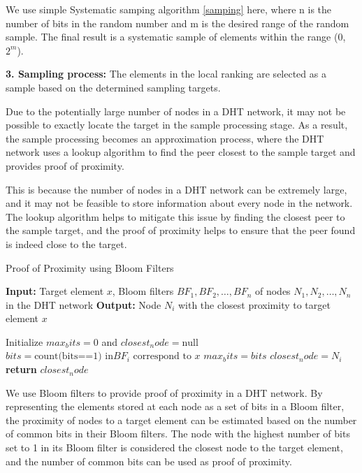 \documentclass[twocolumn]{article}
\begin{document}
We use simple Systematic samping algorithm \ref{samping} here, where n is the number of bits in the random number and m is the desired range of the random sample. The final result is a systematic sample of elements within the range (0, $2^m$).

\textbf{3. Sampling process:} The elements in the local ranking are selected as a sample based on the determined sampling targets.

Due to the potentially large number of nodes in a DHT\cite{Chord} network, it may not be possible to exactly locate the target in the sample processing stage. As a result, the sample processing becomes an approximation process, where the DHT network uses a lookup algorithm to find the peer closest to the sample target and provides proof of proximity.

This is because the number of nodes in a DHT network can be extremely large, and it may not be feasible to store information about every node in the network. The lookup algorithm helps to mitigate this issue by finding the closest peer to the sample target, and the proof of proximity helps to ensure that the peer found is indeed close to the target.

\begin{algorithm}[htbp]
  \caption{Proof of Proximity using Bloom Filters\cite{bloom_filter}}
  \label{bloom}
\begin{algorithmic}[1]
\State \textbf{Input:} Target element $x$, Bloom filters $BF_1, BF_2, \dots, BF_n$ of nodes $N_1, N_2, \dots, N_n$ in the DHT network
\State \textbf{Output:} Node $N_i$ with the closest proximity to target element $x$

\State Initialize $max_bits = 0$ and $closest_node = \text{null}$
\State $bits = \text{count(bits==1) in} BF_i \text{ correspond to } x$
\State $max_bits = bits$
\State $closest_node = N_i$
\EndIf
\EndFor
\State \textbf{return} $closest_node$
\end{algorithmic}
\end{algorithm}

We use Bloom filters to provide proof of proximity in a DHT network. By representing the elements stored at each node as a set of bits in a Bloom filter, the proximity of nodes to a target element can be estimated based on the number of common bits in their Bloom filters. The node with the highest number of bits set to 1 in its Bloom filter is considered the closest node to the target element, and the number of common bits can be used as proof of proximity.
\end{document}
